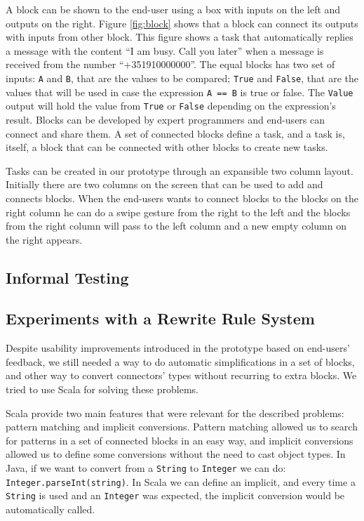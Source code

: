 \documentclass[9pt,a4paper]{extarticle}
\begin{document}
\begin{multicols}{2}
A block can be shown to the end-user using a box with inputs on the left and outputs on the right.
Figure \ref{fig:block} shows that a block can connect its outputs with inputs from other block. This figure shows a task that automatically replies a message with the content ``I am busy. Call you later'' when a message is received from the number ``+351910000000''. The equal blocks has two set of inputs: \texttt{A} and  \texttt{B}, that are the values to be compared; \texttt{True} and  \texttt{False}, that are the values that will be used in case the expression \texttt{A == B} is true or false. The \texttt{Value} output will hold the value from \texttt{True} or \texttt{False} depending on the expression's result. Blocks can be developed by expert programmers and end-users can connect and share them. A set of connected blocks define a task, and a task is, itself, a block that can be connected with other blocks to create new tasks.

Tasks can be created in our prototype through an expansible two column layout. Initially there are two columns on the screen that can be used to add and connects blocks. When the end-users wants to connect blocks to the blocks on the right column he can do a swipe gesture from the right to the left and the blocks from the right column will pass to the left column and a new empty column on the right appears.

\subsection{Informal Testing}

\subsection{Experiments with a Rewrite Rule System}

Despite usability improvements introduced in the prototype based on end-users' feedback, we still needed a way to do automatic simplifications in a set of blocks, and other way to convert connectors' types without recurring
to extra blocks. We tried to use Scala for solving these problems.

Scala provide two main features that were relevant for the described problems: pattern matching and implicit conversions. Pattern matching allowed us to search for patterns in a set of connected blocks in an easy way, and implicit conversions allowed us to define some conversions without the need to cast object types. In Java, if we want to convert from a \texttt{String} to \texttt{Integer} we can do: \texttt{Integer.parseInt(string)}. In Scala we can define an implicit,
and every time a \texttt{String} is used and an \texttt{Integer} was expected, the implicit conversion would be automatically called.


\end{multicols}
\end{document}
